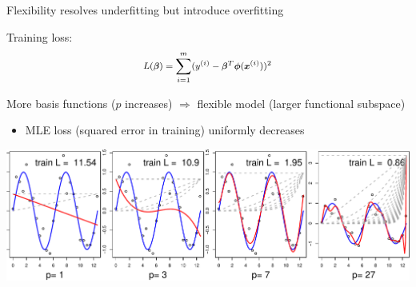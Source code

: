 \documentclass[ignorenonframetext,aspectratio=169]{beamer}
\providecommand{\tightlist}{%
  \setlength{\itemsep}{0pt}\setlength{\parskip}{0pt}}
\newcommand{\vv}[1]{\boldsymbol{#1}}
\newcommand{\dd}[1]{\ensuremath{ #1^{(i)}}}
\newcommand{\Di}[2]{\ensuremath{ \vv{#1}^{(#2)}}}
\begin{document}
\begin{frame}{Flexibility resolves underfitting but introduce
overfitting}
\protect\hypertarget{flexibility-resolves-underfitting-but-introduce-overfitting}{}

Training loss:
\[\footnotesize L(\vv{\beta}) = \sum_{i=1}^m (\dd{y} - \vv{\beta}^T\vv{\phi}(\Di{x}{i}))^2\]

More basis functions (\(p\) increases) \(\Rightarrow\) flexible model
(larger functional subspace)

\begin{itemize}
\tightlist
\item
  MLE loss (squared error in training) uniformly decreases
\end{itemize}

\begin{center}\includegraphics[width=1\linewidth]{lecture10_files/figure-beamer/unnamed-chunk-16-1} \end{center}

\end{frame}
\end{document}
